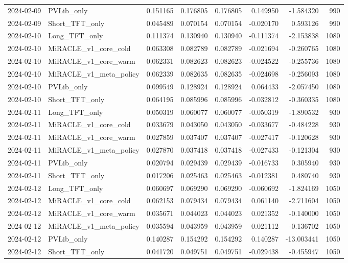 \begin{tabular}{llrrrrrr}
2024-02-09 & PVLib_only & 0.151165 & 0.176805 & 0.176805 & 0.149950 & -1.584320 & 990 \\
2024-02-09 & Short_TFT_only & 0.045489 & 0.070154 & 0.070154 & -0.020170 & 0.593126 & 990 \\
2024-02-10 & Long_TFT_only & 0.111374 & 0.130940 & 0.130940 & -0.111374 & -2.153838 & 1080 \\
2024-02-10 & MiRACLE_v1_core_cold & 0.063308 & 0.082789 & 0.082789 & -0.021694 & -0.260765 & 1080 \\
2024-02-10 & MiRACLE_v1_core_warm & 0.062331 & 0.082623 & 0.082623 & -0.024522 & -0.255736 & 1080 \\
2024-02-10 & MiRACLE_v1_meta_policy & 0.062339 & 0.082635 & 0.082635 & -0.024698 & -0.256093 & 1080 \\
2024-02-10 & PVLib_only & 0.099549 & 0.128924 & 0.128924 & 0.064433 & -2.057450 & 1080 \\
2024-02-10 & Short_TFT_only & 0.064195 & 0.085996 & 0.085996 & -0.032812 & -0.360335 & 1080 \\
2024-02-11 & Long_TFT_only & 0.050319 & 0.060077 & 0.060077 & -0.050319 & -1.890532 & 930 \\
2024-02-11 & MiRACLE_v1_core_cold & 0.033679 & 0.043050 & 0.043050 & -0.033677 & -0.484228 & 930 \\
2024-02-11 & MiRACLE_v1_core_warm & 0.027859 & 0.037407 & 0.037407 & -0.027417 & -0.120628 & 930 \\
2024-02-11 & MiRACLE_v1_meta_policy & 0.027870 & 0.037418 & 0.037418 & -0.027433 & -0.121304 & 930 \\
2024-02-11 & PVLib_only & 0.020794 & 0.029439 & 0.029439 & -0.016733 & 0.305940 & 930 \\
2024-02-11 & Short_TFT_only & 0.017206 & 0.025463 & 0.025463 & -0.012381 & 0.480740 & 930 \\
2024-02-12 & Long_TFT_only & 0.060697 & 0.069290 & 0.069290 & -0.060692 & -1.824169 & 1050 \\
2024-02-12 & MiRACLE_v1_core_cold & 0.062153 & 0.079434 & 0.079434 & 0.061140 & -2.711604 & 1050 \\
2024-02-12 & MiRACLE_v1_core_warm & 0.035671 & 0.044023 & 0.044023 & 0.021352 & -0.140000 & 1050 \\
2024-02-12 & MiRACLE_v1_meta_policy & 0.035594 & 0.043959 & 0.043959 & 0.021112 & -0.136702 & 1050 \\
2024-02-12 & PVLib_only & 0.140287 & 0.154292 & 0.154292 & 0.140287 & -13.003441 & 1050 \\
2024-02-12 & Short_TFT_only & 0.041720 & 0.049751 & 0.049751 & -0.029438 & -0.455947 & 1050 \\

\end{tabular}

